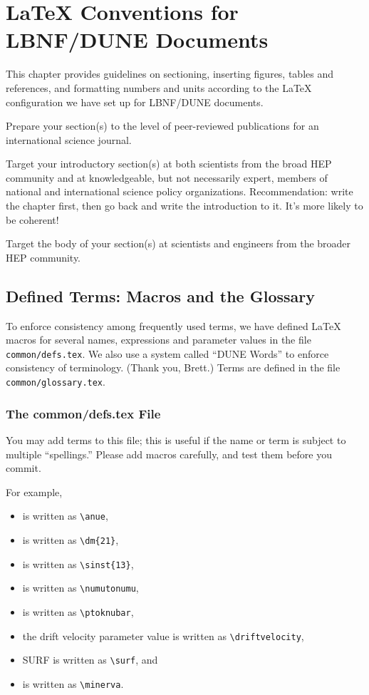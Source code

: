 
\chapter{\LaTeX{} Conventions for LBNF/DUNE Documents}
\label{ch:latex-stds}

This chapter provides guidelines on sectioning, inserting figures, tables and references, and formatting numbers and units according to the \LaTeX{} configuration we have set up for LBNF/DUNE documents.

Prepare your section(s) to the level of peer-reviewed publications for an international science journal.
 
Target your introductory section(s) at both scientists from the broad HEP community and at knowledgeable, but not necessarily expert, members of national and international science policy organizations. Recommendation: write the chapter first, then go back and write the introduction to it. It's more likely to be coherent!

Target the body of your section(s) at scientists and engineers from the broader HEP community.


\section{Defined Terms: Macros and the Glossary}
\label{sec:latex-terms}

To enforce consistency among frequently used terms, we have defined \LaTeX{} macros for several names, expressions and parameter values in the file \texttt{common/defs.tex}.  We also use a system called ``DUNE Words'' to enforce consistency of terminology. (Thank you, Brett.)  Terms are defined in the file \texttt{common/glossary.tex}.

\subsection{The common/defs.tex File}

You may add terms
to this file; this is useful if the name or term is subject
to multiple ``spellings.''  Please add macros carefully, and test them before you commit. 

For example,
\begin{itemize}
\item \anue is written as \verb|\anue|,
\item {} is written as \verb|\dm{21}|,
\item {} is written as \verb|\sinst{13}|,
\item \numutonumu is written as \verb|\numutonumu|,
\item \ptoknubar is written as \verb|\ptoknubar|,
\item the drift velocity parameter value \driftvelocity is written as \verb|\driftvelocity|,
\item SURF is written as \verb|\surf|, and
\item \minerva is written as \verb|\minerva|.
\end{itemize}

